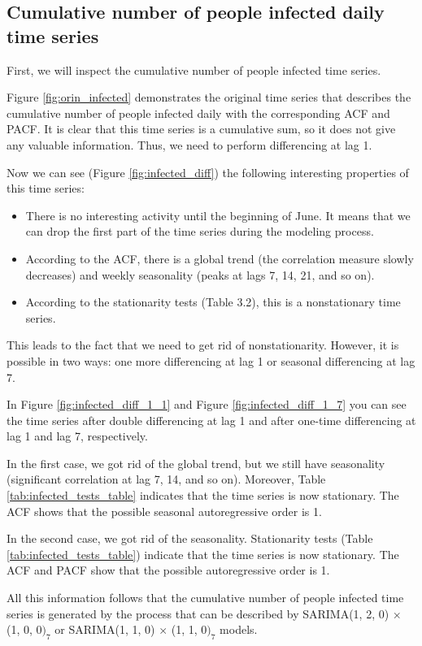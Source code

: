 \subsection{Cumulative number of people infected daily time series}

First, we will inspect the cumulative number of people infected time series.

Figure \ref{fig:orin_infected} demonstrates the original time series that describes the cumulative number of people infected daily with the corresponding ACF and PACF. It is clear that this time series is a cumulative sum, so it does not give any valuable information. Thus, we need to perform differencing at lag 1.

Now we can see (Figure \ref{fig:infected_diff}) the following interesting properties of this time series:
\begin{itemize}
    \item There is no interesting activity until the beginning of June. It means that we can drop the first part of the time series during the modeling process.
    \item According to the ACF, there is a global trend (the correlation measure slowly decreases) and weekly seasonality (peaks at lags 7, 14, 21, and so on).
    \item According to the stationarity tests (Table 3.2), this is a nonstationary time series.
\end{itemize}
This leads to the fact that we need to get rid of nonstationarity. However, it is possible in two ways: one more differencing at lag 1 or seasonal differencing at lag 7. 

In Figure \ref{fig:infected_diff_1_1} and Figure \ref{fig:infected_diff_1_7} you can see the time series after double differencing at lag 1 and after one-time differencing at lag 1 and lag 7, respectively. 

In the first case, we got rid of the global trend, but we still have seasonality (significant correlation at lag 7, 14, and so on). Moreover, Table \ref{tab:infected_tests_table} indicates that the time series is now stationary. The ACF shows that the possible seasonal autoregressive order is 1.

In the second case, we got rid of the seasonality. Stationarity tests (Table \ref{tab:infected_tests_table}) indicate that the time series is now stationary. The ACF and PACF show that the possible autoregressive order is 1.

All this information follows that the cumulative number of people infected time series is generated by the process that can be described by SARIMA(1, 2, 0) $\times$ (1, 0, 0$)_7$ or SARIMA(1, 1, 0) $\times$ (1, 1, 0$)_7$ models.

